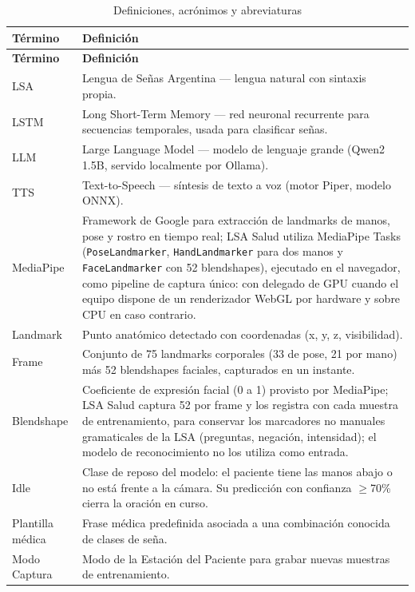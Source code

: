 \begin{longtable}{p{4cm} p{10cm}}
    \caption{Definiciones, acrónimos y abreviaturas}
    \label{tab:definiciones} \\
    \toprule
    \textbf{Término} & \textbf{Definición} \\
    \midrule
    \endfirsthead
    \toprule
    \textbf{Término} & \textbf{Definición} \\
    \midrule
    \endhead
    LSA & Lengua de Señas Argentina --- lengua natural con sintaxis propia. \\
    LSTM & Long Short-Term Memory --- red neuronal recurrente para secuencias temporales, usada para clasificar señas. \\
    LLM & Large Language Model --- modelo de lenguaje grande (Qwen2 1.5B, servido localmente por Ollama). \\
    TTS & Text-to-Speech --- síntesis de texto a voz (motor Piper, modelo ONNX). \\
    MediaPipe & Framework de Google para extracción de landmarks de manos, pose y rostro en tiempo real; LSA Salud utiliza MediaPipe Tasks (\texttt{PoseLandmarker}, \texttt{HandLandmarker} para dos manos y \texttt{FaceLandmarker} con 52 blendshapes), ejecutado en el navegador, como pipeline de captura único: con delegado de GPU cuando el equipo dispone de un renderizador WebGL por hardware y sobre CPU en caso contrario. \\
    Landmark & Punto anatómico detectado con coordenadas (x, y, z, visibilidad). \\
    Frame & Conjunto de 75 landmarks corporales (33 de pose, 21 por mano) más 52 blendshapes faciales, capturados en un instante. \\
    Blendshape & Coeficiente de expresión facial (0 a 1) provisto por MediaPipe; LSA Salud captura 52 por frame y los registra con cada muestra de entrenamiento, para conservar los marcadores no manuales gramaticales de la LSA (preguntas, negación, intensidad); el modelo de reconocimiento no los utiliza como entrada. \\
    Idle & Clase de reposo del modelo: el paciente tiene las manos abajo o no está frente a la cámara. Su predicción con confianza $\geq$70\% cierra la oración en curso. \\
    Plantilla médica & Frase médica predefinida asociada a una combinación conocida de clases de seña. \\
    Modo Captura & Modo de la Estación del Paciente para grabar nuevas muestras de entrenamiento. \\

\end{longtable}

